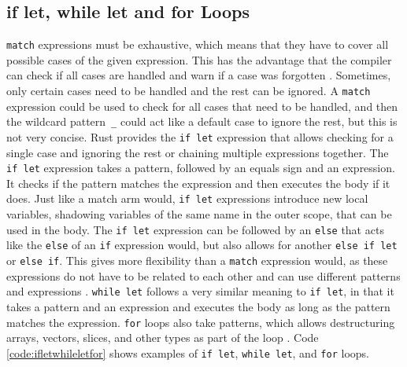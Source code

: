 \subsection{if let, while let and for Loops}
\noindent \texttt{match} expressions must be exhaustive, which means that they have to cover all possible cases of the given expression.
This has the advantage that the compiler can check if all cases are handled and warn if a case was forgotten \cite[Chapter~6.2]{rustbook}.
Sometimes, only certain cases need to be handled and the rest can be ignored.
A \texttt{match} expression could be used to check for all cases that need to be handled, and then the wildcard pattern~\texttt{\_} could act like a default case to ignore the rest, but this is not very concise.
Rust provides the \texttt{if let} expression that allows checking for a single case and ignoring the rest or chaining multiple expressions together.
The \texttt{if let} expression takes a pattern, followed by an equals sign and an expression. It checks if the pattern matches the expression and then executes the body if it does.
Just like a match arm would, \texttt{if let} expressions introduce new local variables, shadowing variables of the same name in the outer scope, that can be used in the body.
The \texttt{if let} expression can be followed by an \texttt{else} that acts like the \texttt{else} of an \texttt{if} expression would, but also allows for another \texttt{else if let} or \texttt{else if}.
This gives more flexibility than a \texttt{match} expression would, as these expressions do not have to be related to each other and can use different patterns and expressions \cite[Chapter~6.3]{rustbook}.
\texttt{while let} follows a very similar meaning to \texttt{if let}, in that it takes a pattern and an expression and executes the body as long as the pattern matches the expression.
\texttt{for} loops also take patterns, which allows destructuring arrays, vectors, slices, and other types as part of the loop \cite[Chapter~18.1]{rustbook}.
Code \ref{code:ifletwhileletfor} shows examples of \texttt{if let}, \texttt{while let}, and \texttt{for} loops.


